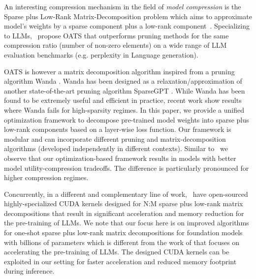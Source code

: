 An interesting compression mechanism in the field of \textit{model compression} is the Sparse plus Low-Rank Matrix-Decomposition problem which aims to approximate model's weights by a sparse component plus a low-rank component~\cite{hintermuller2015robust, candes2011robust, lin2011linearized, 5394889, zhou2011godec, JMLR:v24:21-1130, NIPS2014_443cb001, yu2017compressing, li2023losparse}. Specializing to LLMs,~\citet{zhang2024oats} propose OATS 
that outperforms pruning methods for the same compression ratio (number of non-zero elements) on a wide range of LLM evaluation benchmarks (e.g. perplexity in Language generation). 

OATS \cite{zhang2024oats} is however a matrix decomposition algorithm inspired from a pruning algorithm Wanda \cite{sun2023simple}. Wanda has been designed as a relaxation/approximation of another state-of-the-art pruning algorithm SparseGPT \cite{frantar2023sparsegpt}. While Wanda has been found to be extremely useful and efficient in practice, recent work \cite{meng2024alps} show results where Wanda fails for high-sparsity regimes. In this paper, we provide a unified optimization framework to decompose pre-trained model weights into sparse plus low-rank components based on a layer-wise loss function. Our framework is modular and can incorporate different pruning and matrix-decomposition algorithms (developed independently in different contexts).
Similar to~\cite{meng2024alps} we observe that our optimization-based framework results in models with better model utility-compression tradeoffs. The difference is particularly pronounced for higher compression regimes. 

Concurrently, in a different and complementary line of work,~\citet{mozaffari2024slope} have open-sourced highly-specialized CUDA kernels designed for N:M sparse \cite{zhou2021learning} plus low-rank matrix decompositions that result in significant acceleration and memory reduction for the pre-training of LLMs.
We note that our focus here is on improved algorithms for one-shot sparse plus low-rank matrix decompositions for foundation models with billions of parameters which is different from the work of \citet{mozaffari2024slope} that focuses on accelerating the pre-training of LLMs. The designed CUDA kernels \cite{mozaffari2024slope} can be exploited in our setting for faster acceleration and reduced memory footprint during inference.





